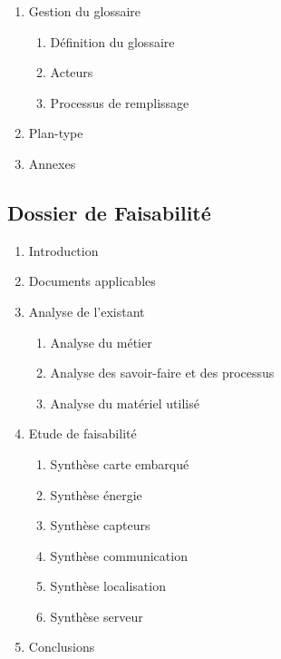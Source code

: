 {\begin{enumerate}
\begin{enumerate}
\item Documentation informatique
\item Documentation papier
\end{enumerate}
\item Gestion du glossaire
\begin{enumerate}
\item Définition du glossaire
\item Acteurs
\item Processus de remplissage
\end{enumerate}
\item Plan-type
\item Annexes
\end{enumerate}

\subsection{Dossier de Faisabilité}
\begin{enumerate}
\item Introduction
\item Documents applicables
\item Analyse de l'existant
\begin{enumerate}
\item Analyse du métier
\item Analyse des savoir-faire et des processus
\item Analyse du matériel utilisé
\end{enumerate}
\item Etude de faisabilité
\begin{enumerate}
\item Synthèse carte embarqué
\item Synthèse énergie
\item Synthèse capteurs
\item Synthèse communication
\item Synthèse localisation
\item Synthèse serveur
\end{enumerate}
\item Conclusions
\end{enumerate}

}
